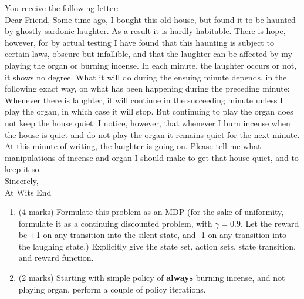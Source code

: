 \documentclass[addpoints,12pt,solution]{exam}
\begin{document}
\begin{questions}
         You receive the following letter:\\
        Dear Friend, Some time ago, I bought this old house, but found it to be haunted by
        ghostly sardonic laughter. As a result it is hardly habitable. There is hope, however,
        for by actual testing I have found that this haunting is subject to certain laws, obscure
        but infallible, and that the laughter can be affected by my playing the organ or burning
        incense. In each minute, the laughter occurs or not, it shows no degree. What it will
        do during the ensuing minute depends, in the following exact way, on what has been
        happening during the preceding minute: Whenever there is laughter, it will continue in
        the succeeding minute unless I play the organ, in which case it will stop. But continuing
        to play the organ does not keep the house quiet. I notice, however, that whenever I
        burn incense when the house is quiet and do not play the organ it remains quiet for the
        next minute. At this minute of writing, the laughter is going on. Please tell me what
        manipulations of incense and organ I should make to get that house quiet, and to keep
        it so.\\
        Sincerely,\\
        At Wits End

        \begin{enumerate}[label=(\alph*)]

            \item (4 marks) Formulate this problem as an MDP (for the sake of uniformity, formulate it as a
            continuing discounted problem, with $\gamma= 0.9$. Let the reward be +1 on any transition
            into the silent state, and -1 on any transition into the laughing state.) Explicitly give the
            state set, action sets, state transition, and reward function.

            \begin{solution}


            \end{solution}

            \item (2 marks) Starting with simple policy of \textbf{always} burning incense, and not playing organ, perform a couple of policy iterations.

            \begin{solution}


            \end{solution}


\end{enumerate}
\end{questions}
\end{document}
